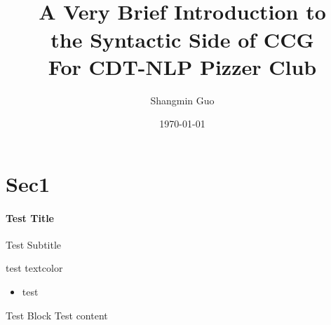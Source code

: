 \documentclass[mathserif,xcolor=dvipsnames,svgnames,aspectratio=43,compress]{beamer}
\begin{document}
\title{\\\medskip \LARGE{A Very Brief Introduction to \\ the Syntactic Side of CCG} %
    \\\medskip
    \Large\textcolor{beautyblue}{For CDT-NLP Pizzer Club}}
    
\author{\large{Shangmin Guo}}
\date[\today]{\today} %

\begin{frame}
    \titlepage
\end{frame}

\section{Sec1}

\begin{frame}[t]
    \framesubtitle{Test Title}{Test Subtitle}

    test textcolor

    \begin{itemize}
        \item test
    \end{itemize}

    \begin{block}{Test Block}
        Test content
    \end{block}

\end{frame}
\end{document}
